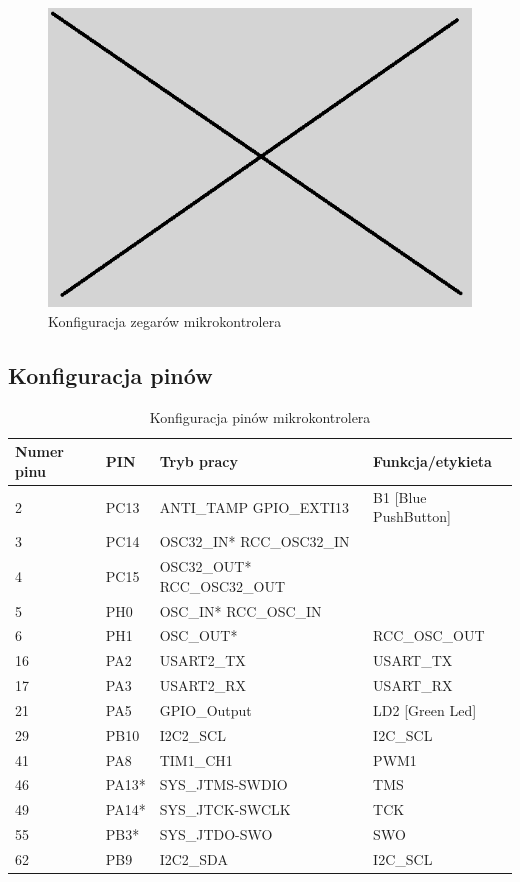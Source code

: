 \documentclass[10pt, a4paper]{article}
\begin{document}
\newpage
\begin{figure}[H]
	\centering
	\includegraphics[width=0.9\textheight,angle=90]{figures/obraz.png}
	\caption{Konfiguracja zegarów mikrokontrolera}
	\label{fig:KonfiguracjaZegara}
\end{figure}

\subsection{Konfiguracja pinów}

\begin{table}[H]
	\centering
	\begin{tabular}{|l|l|l|l|}
		\hline
		Numer pinu	&	PIN & Tryb pracy & Funkcja/etykieta\\
		\hline
		2&	PC13 & ANTI\_TAMP	GPIO\_EXTI13	&B1 [Blue PushButton]\\
		3&	PC14 & OSC32\_IN*	RCC\_OSC32\_IN	&\\
		4&	PC15 & OSC32\_OUT*	RCC\_OSC32\_OUT	&\\
		5&	PH0&  OSC\_IN*	RCC\_OSC\_IN	&\\
		6&	PH1&  OSC\_OUT*&		RCC\_OSC\_OUT	\\
		16&	PA2&	USART2\_TX&	USART\_TX\\
		17&	PA3&	USART2\_RX&	USART\_RX\\
		21&	PA5&	GPIO\_Output&	LD2 [Green Led]\\
		29&	PB10&	I2C2\_SCL&	I2C\_SCL\\
		41&	PA8&	TIM1\_CH1&	PWM1\\
		46&	PA13*&	SYS\_JTMS-SWDIO&	TMS\\
		49&	PA14*&	SYS\_JTCK-SWCLK&	TCK\\
		55&	PB3*&	SYS\_JTDO-SWO&	SWO\\
		62&	PB9&	I2C2\_SDA&	I2C\_SCL\\
		\hline
	\end{tabular}
	\caption{Konfiguracja pinów mikrokontrolera}
	
\end{table}
\end{document}
